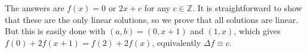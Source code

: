 The answers are $f(x)=0$ or $2x+c$ for any $c\in\mathbb{Z}$. It is straightforward to show that these are the only linear solutions, so we prove that all solutions are linear. But this is easily done with $(a,b)=(0,x+1)$ and $(1,x)$, which gives $f(0)+2f(x+1)=f(2)+2f(x)$, equivalently $\Delta f\equiv c$.
